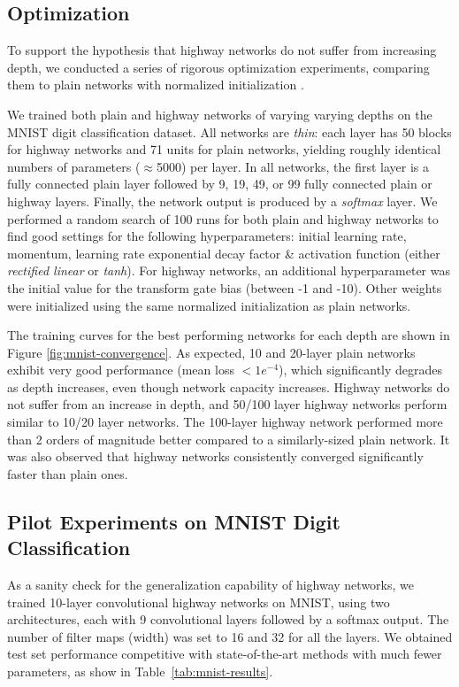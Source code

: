 \documentclass{article}
\begin{document}
\subsection{Optimization}\label{sec:opti}
To support the hypothesis that highway networks do not suffer from increasing depth, we conducted a series of rigorous optimization experiments, comparing them to plain networks with normalized initialization \cite{Glorot2010,He2015}.

We trained both plain and highway networks of varying varying depths on the MNIST digit classification dataset. 
All networks are \emph{thin}: each layer has 50 blocks for highway networks and 71 units for plain networks, yielding roughly identical numbers of parameters ($\approx$5000) per layer.
In all networks, the first layer is a fully connected plain layer followed by 9, 19, 49, or 99 fully connected plain or highway layers. Finally, the network output is produced by a \emph{softmax} layer. 
We performed a random search of 100 runs for both plain and highway networks to find good settings for the following hyperparameters: initial learning rate, momentum, learning rate exponential decay factor \& activation function (either \textit{rectified linear} or \textit{tanh}). For highway networks, an additional hyperparameter was the initial value for the transform gate bias (between -1 and -10). Other weights were initialized using the same normalized initialization as plain networks.

The training curves for the best performing networks for each depth are shown in Figure \ref{fig:mnist-convergence}. As expected, 10 and 20-layer plain networks exhibit very good performance (mean loss $<1e^{-4}$), which significantly degrades as depth increases, even though network capacity increases.
Highway networks do not suffer from an increase in depth, and 50/100 layer highway networks perform similar to 10/20 layer networks. The 100-layer highway network performed more than 2 orders of magnitude better compared to a similarly-sized plain network.
It was also observed that highway networks consistently converged significantly faster than plain ones.


\subsection{Pilot Experiments on MNIST Digit Classification}
As a sanity check for the generalization capability of highway networks, we trained 10-layer convolutional highway networks on MNIST, using two architectures, each with 9 convolutional layers followed by a softmax output. The number of filter maps (width) was set to 16 and 32 for all the layers. We obtained test set performance competitive with state-of-the-art methods with much fewer parameters, as show in Table~\ref{tab:mnist-results}.
\end{document}
